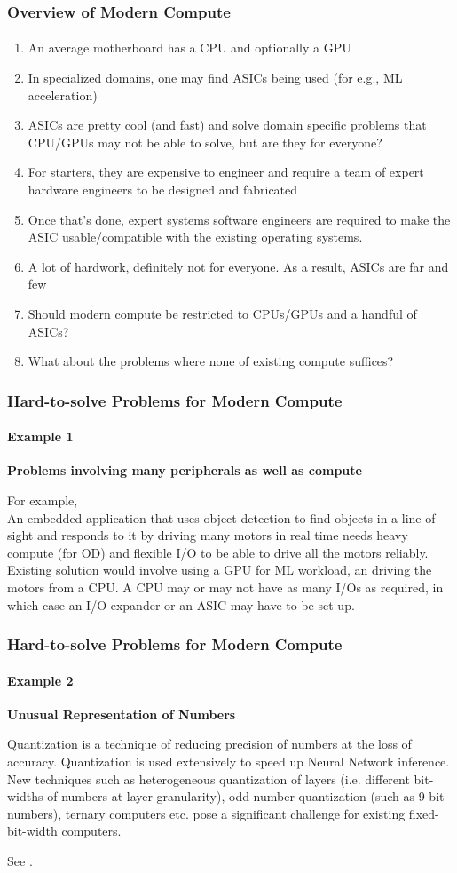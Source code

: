 \documentclass{beamer}
\begin{document}
\begin{frame}[fragile]
\frametitle{Overview of Modern Compute}
\framesubtitle{}
  \begin{enumerate}
    \item An average motherboard has a CPU and optionally a GPU
    \item In specialized domains, one may find ASICs being used (for e.g., 
      ML acceleration)
    \item ASICs are pretty cool (and fast) and solve domain specific problems
      that CPU/GPUs may not be able to solve, but are they for everyone?
    \item For starters, they are expensive to engineer and require a team
      of expert hardware engineers to be designed and fabricated
    \item Once that's done, expert systems software engineers are required
      to make the ASIC usable/compatible with the existing operating systems.
    \item A lot of hardwork, definitely not for everyone.  As a result, ASICs are far and few
    \item Should modern compute be restricted to CPUs/GPUs and a handful
      of ASICs?
    \item What about the problems where none of existing compute suffices?
  \end{enumerate}
\end{frame}

\begin{frame}[fragile]
  \frametitle{Hard-to-solve Problems for Modern Compute}
  \framesubtitle{Example 1}
  \textbf{Problems involving many peripherals as well as compute}

  For example, \\

  An embedded application that uses object detection to find
  objects in a line of sight and responds to it by driving many motors in
  real time needs heavy compute (for OD) and flexible I/O to be able to 
  drive all the motors reliably. \\

  Existing solution would involve using a GPU for ML workload, an
  driving the motors from a CPU. A CPU may or may not have as many I/Os
  as required, in which case an I/O expander or an ASIC may have to be set up.
\end{frame}

\begin{frame}[fragile]
  \frametitle{Hard-to-solve Problems for Modern Compute}
  \framesubtitle{Example 2}
  \textbf{Unusual Representation of Numbers}

  Quantization is a technique of reducing precision of numbers at the loss of
  accuracy. Quantization is used extensively to speed up Neural Network
  inference. New techniques such as heterogeneous quantization of layers (i.e.
  different bit-widths of numbers at layer granularity), odd-number quantization
  (such as 9-bit numbers), ternary computers etc. pose a significant challenge
  for existing fixed-bit-width computers. 

  See \cite{coelho21}.

\end{frame}
\end{document}
